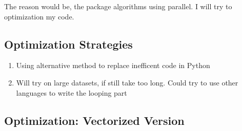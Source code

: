 \documentclass{article}
\begin{document}
The reason would be, the package algorithms using parallel. I will try
to optimization my code.

    \subsection{Optimization Strategies}\label{optimization-strategies}

    \begin{enumerate}
\def\labelenumi{\arabic{enumi}.}
\itemsep1pt\parskip0pt
\item
  Using alternative method to replace inefficent code in Python
\item
  Will try on large datasets, if still take too long. Could try to use
  other languages to write the looping part
\end{enumerate}

    \subsection{Optimization: Vectorized
Version}\label{optimization-vectorized-version}
\end{document}
